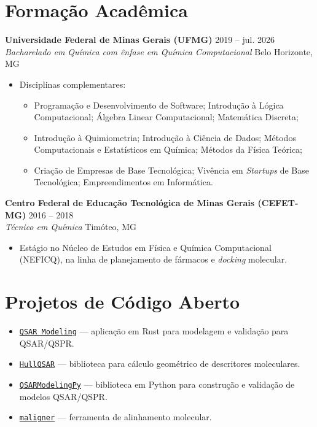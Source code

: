 \documentclass[10pt,a4paper]{article}
\newcommand{\entry}[4]{%
  \textbf{\sffamily\large #1} \hfill #2 \\
  {\itshape #3} \hfill {\small #4} \\[-0.75em]
}
\newcommand*{\link}[2]{\href{#1}{{\texttt{#2}}}}
\begin{document}
\section*{Formação Acadêmica}
\entry{Universidade Federal de Minas Gerais (UFMG)}{2019 -- jul. 2026}{Bacharelado em Química com ênfase em Química Computacional}{Belo Horizonte, MG}
\begin{itemize}\footnotesize
  \item Disciplinas complementares:
  \begin{itemize}
      \item Programação e Desenvolvimento de Software; Introdução à Lógica Computacional; Álgebra Linear Computacional; Matemática Discreta;
      \item Introdução à Quimiometria; Introdução à Ciência de Dados; Métodos Computacionais e Estatísticos em Química; Métodos da Física Teórica;
      \item Criação de Empresas de Base Tecnológica; Vivência em \textit{Startups} de Base Tecnológica; Empreendimentos em Informática.
    \end{itemize}
\end{itemize}

\vspace{0.5em}

\entry{Centro Federal de Educação Tecnológica de Minas Gerais (CEFET-MG)}{2016 -- 2018}{Técnico em Química}{Timóteo, MG}
\begin{itemize}\footnotesize
  \item Estágio no Núcleo de Estudos em Física e Química Computacional (NEFICQ), na linha de planejamento de fármacos e \textit{docking} molecular.
\end{itemize}

\section*{Projetos de Código Aberto}
\begin{itemize}
  \item \link{https://github.com/lacc-ufmg/qsarmodeling}{QSAR Modeling} --- aplicação em Rust para modelagem e validação para QSAR/QSPR.
  \item \link{https://github.com/hellmrf/HullQSAR}{HullQSAR} --- biblioteca para cálculo geométrico de descritores moleculares.
  \item \link{https://github.com/lacc-ufmg/QSARModelingPy}{QSARModelingPy} --- biblioteca em Python para construção e validação de modelos QSAR/QSPR.
  \item \link{https://github.com/hellmrf/maligner}{maligner} --- ferramenta de alinhamento molecular.
\end{itemize}
\end{document}
